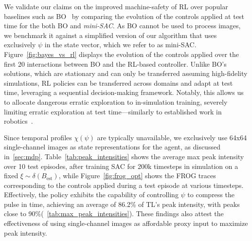 We validate our claims on the improved machine-safety of RL over popular baselines such as BO~\citep{shalloo2020automation} by comparing the evolution of the controls applied at test time for the both BO and \emph{mini-SAC}. As BO cannot be used to process images, we benchmark it against a simplified version of our algorithm that uses exclusively $\psi$ in the state vector, which we refer to as mini-SAC. Figure~\ref{fig:bayes_vs_rl} displays the evolution of the controls applied over the first 20 interactions between BO and the RL-based controller. Unlike BO's solutions, which are stationary and can only be transferred assuming high-fidelity simulations, RL policies can be transferred across domains and adapt at test time, leveraging a sequential decision-making framework.
Notably, this allows us to allocate dangerous erratic exploration to in-simulation training, severely limiting erratic exploration at test time---similarly to established work in robotics~\citep{kober2013reinforcement}. 

Since temporal profiles $\chi(\psi)$ are typically unavailable, we exclusively use 64x64 single-channel images as state representations for the agent, as discussed in~\ref{sec:mdp}. 
Table~\ref{tab:peak_intensities} shows the average max peak intensity over 10 test episodes, after training SAC for 200k timesteps in simulation on a fixed \( \xi \sim \delta(B_{\text{est}}) \), while Figure~\ref{fig:frog_opt} shows the FROG traces corresponding to the controls applied during a test episode at various timesteps. Effectively, the policy exhibits the capability of controlling $\psi$ to compress the pulse in time, achieving an average of 86.2\% of TL's peak intensity, with peaks close to 90\%(~\ref{tab:max_peak_intensities}). These findings also attest the effectiveness of using single-channel images as affordable proxy input to maximize peak intensity.

